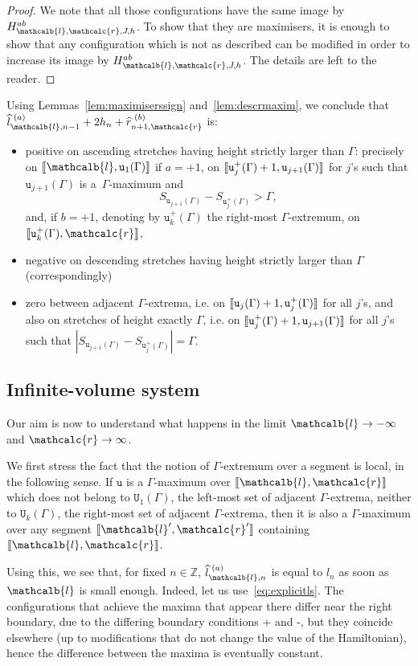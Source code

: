\documentclass[AHL,Unicode,longabstracts,published]{cedram}
\newcommand{\Z}{\mathbb{Z}}
\newcommand{\gG}{\Gamma}
\renewcommand*\ss{\mathtt{u}}
\newcommand{\tu}{\ss}
\newcommand{\tU}{\mathtt{U}}
\newcommand{\ls}{\widehat{l}}
\newcommand{\rs}{\widehat{r}}
\renewcommand{\ell}{\mathcalb{l}}
\newcommand{\err}{\mathcalc{r}}
\newcommand{\llbracket}{\mathopen{[\mkern -2.7mu[}}
\newcommand{\rrbracket}{\mathclose{]\mkern -2.7mu]}}
\newcommand{\lbra}{\llbracket}
\newcommand{\rbra}{\rrbracket}
\renewcommand*{\to}{\mathchoice{\longrightarrow}{\rightarrow}{\rightarrow}{\rightarrow}}
\begin{document}
\begin{proof}
We note that all those configurations have the same image by $H_{\ell, \err, J, h}^{ab}$. To show that they are maximisers, it is enough to show that any configuration which is not as described can be modified in order to increase its image by $H_{\ell, \err, J, h}^{ab}$. The details are left to the reader.
\end{proof}

Using Lemmas~\ref{lem:maximiserssign} and~\ref{lem:descrmaxim}, we conclude that $\ls_{\ell, n-1}^{\,\,(a)}+2 h_n + \rs_{n+1, \err}^{\,\,(b)}$ is:
\begin{itemize}
\item positive on ascending stretches having height strictly larger than $\gG$: precisely on $\lbra \ell, \tu_1(\gG)\rbra$ if $a=+1$, on $\lbra\tu_j^+(\gG)+1, \tu_{j+1}(\gG)\rbra$ for $j$'s such that $\tu_{j+1}(\gG)$ is a~$\gG$-maximum and 
\[
S_{\tu_{j+1}(\gG)}-S_{\tu_j^+(\gG)}>\gG,
\]
and, if $b=+1$, denoting by $\tu_k^+(\gG)$ the right-most $\gG$-extremum, on $\lbra \tu_k^+(\gG), \err\rbra$,
\item negative on descending stretches having height strictly larger than $\gG$ (correspondingly)
\item zero between adjacent $\gG$-extrema, i.e. on $\lbra\tu_j(\gG)+1, \tu_j^+(\gG)\rbra$ for all $j$'s, and also on stretches of height exactly $\gG$, i.e. on $\lbra\tu_j^+(\gG)+1, \tu_{j+1}(\gG)\rbra$ for all $j$'s such that $| S_{\tu_{j+1}(\gG)}-S_{\tu_j^+(\gG)}|=\gG $.
\end{itemize}

\subsection{Infinite-volume system}

Our aim is now to understand what happens in the limit $\ell\to -\infty$ and $\err\to \infty$.

We first stress the fact that the notion of $\gG$-extremum over a segment is local, in the following sense. If $\tu$ is a $\gG$-maximum over $\lbra\ell, \err\rbra$ which does not belong to $\tU_1(\gG)$, the left-most set of adjacent $\gG$-extrema, neither to $\tU_k(\gG)$, the right-most set of adjacent $\gG$-extrema, then it is also a $\gG$-maximum over any segment $\lbra\ell', \err'\rbra$ containing~$\lbra\ell, \err\rbra$.

Using this, we see that, for fixed $n\in \Z$, $\ls_{\ell, n}^{\,\,(a)}$ is equal to $\ls_n$ as soon as $\ell$ is small enough. Indeed, let us use~\eqref{eq:explicitls}. The configurations that achieve the maxima that appear there differ near the right boundary, due to the differing boundary conditions + and -, but they coincide elsewhere (up to modifications that do not change the value of the Hamiltonian), hence the difference between the maxima is eventually constant.
\end{document}
